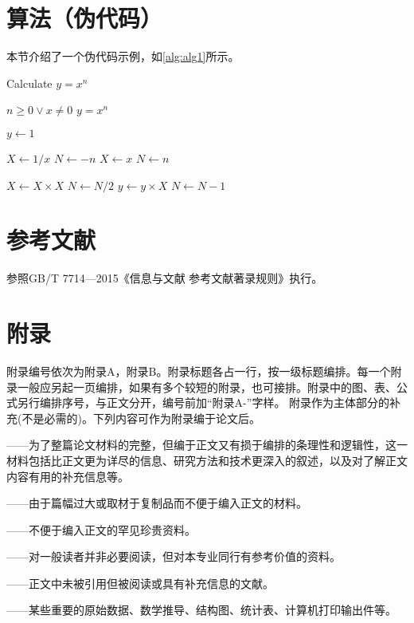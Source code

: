 \section{算法（伪代码）}
本节介绍了一个伪代码示例，如\cref{alg:alg1}所示。
\begin{algorithm}
	\caption{Calculate $y = x^n$} 
	\label{alg:alg1}
	\begin{algorithmic}
		\REQUIRE $n \geq 0 \vee x \neq 0$ 
		\ENSURE $y = x^n$ 
		
		\STATE $y \leftarrow 1$ 
		
			\STATE $X \leftarrow 1 / x$ 
			\STATE $N \leftarrow -n$ 
		\ELSE 
			\STATE $X \leftarrow x$ 
			\STATE $N \leftarrow n$
		\ENDIF
		
				\STATE $X \leftarrow X \times X$ 
				\STATE $N \leftarrow N / 2$ 
				\STATE $y \leftarrow y \times X$ 
				\STATE $N \leftarrow N - 1$ 
			\ENDIF 
		\ENDWHILE
	\end{algorithmic}
\end{algorithm}

\section{参考文献}
参照GB/T 7714—2015《信息与文献 参考文献著录规则》执行。
\section{附录}
附录编号依次为附录A，附录B。附录标题各占一行，按一级标题编排。每一个附录一般应另起一页编排，如果有多个较短的附录，也可接排。附录中的图、表、公式另行编排序号，与正文分开，编号前加“附录A-”字样。
附录作为主体部分的补充(不是必需的)。下列内容可作为附录编于论文后。

——为了整篇论文材料的完整，但编于正文又有损于编排的条理性和逻辑性，这一材料包括比正文更为详尽的信息、研究方法和技术更深入的叙述，以及对了解正文内容有用的补充信息等。

——由于篇幅过大或取材于复制品而不便于编入正文的材料。

——不便于编入正文的罕见珍贵资料。

——对一般读者并非必要阅读，但对本专业同行有参考价值的资料。

——正文中未被引用但被阅读或具有补充信息的文献。

——某些重要的原始数据、数学推导、结构图、统计表、计算机打印输出件等。
